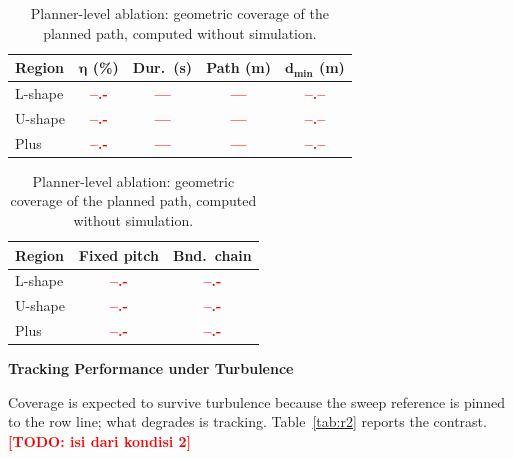 \documentclass[10pt,letterpaper]{article}
\newcommand{\headingtwo}[1]{%
    \par\vspace{7pt}%
    {\centering\fontsize{12}{14}\selectfont\bfseries #1\par}%
    \vspace{3pt}\noindent\ignorespaces}
\newcommand{\val}[1]{\textcolor{red}{\textbf{#1}}}
\newcommand{\TODO}[1]{\textcolor{red}{\textbf{[TODO: #1]}}}
\begin{document}
\begin{table}[tbp]
    \centering
    \begin{minipage}[t]{0.56\textwidth}\centering\footnotesize
        \caption{Nominal coverage, flown.}
        \label{tab:r1}
        \begin{tabular}{lcccc}
            \toprule
            \textbf{Region} & $\boldsymbol{\eta}$ \textbf{(\%)} & \textbf{Dur.\ (s)} & \textbf{Path (m)} & $\boldsymbol{d_{\min}}$ \textbf{(m)} \\
            \midrule
            L-shape         & \val{--.-}                        & \val{---}          & \val{---}         & \val{--.--}                          \\
            U-shape         & \val{--.-}                        & \val{---}          & \val{---}         & \val{--.--}                          \\
            Plus            & \val{--.-}                        & \val{---}          & \val{---}         & \val{--.--}                          \\
            \bottomrule
        \end{tabular}
    \end{minipage}\hfill
    \begin{minipage}[t]{0.42\textwidth}\centering\footnotesize
        \caption{Planner-level ablation: geometric coverage of the planned path, computed
            without simulation.}
        \label{tab:abl}
        \begin{tabular}{lcc}
            \toprule
            \textbf{Region} & \textbf{Fixed pitch} & \textbf{Bnd.\ chain} \\
            \midrule
            L-shape         & \val{--.-}           & \val{--.-}           \\
            U-shape         & \val{--.-}           & \val{--.-}           \\
            Plus            & \val{--.-}           & \val{--.-}           \\
            \bottomrule
        \end{tabular}
    \end{minipage}
\end{table}

\headingtwo{Tracking Performance under Turbulence}

Coverage is expected to survive turbulence because the sweep reference is pinned to the row
line; what degrades is tracking. Table~\ref{tab:r2} reports the contrast.
\TODO{isi dari kondisi 2}
\end{document}
